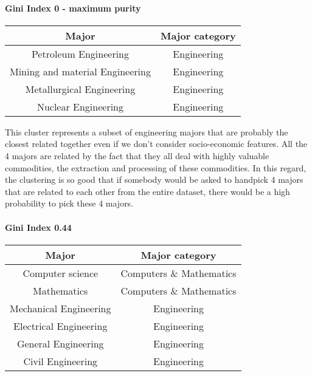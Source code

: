 \documentclass[11pt]{article}
\begin{document}
\paragraph*{Gini Index 0 - maximum purity}

\begin{center}
    \begin{tabular}{||c c||} 
     \hline
     Major & Major category \\ [0.5ex] 
     \hline\hline
     Petroleum Engineering & Engineering \\ 
     \hline
     Mining and material Engineering & Engineering \\
     \hline
     Metallurgical Engineering & Engineering\\
     \hline
     Nuclear Engineering & Engineering\\
     \hline
    \end{tabular}
\end{center}

This cluster represents a subset of engineering majors that are probably the closest related together even if we don't consider socio-economic features. All the 4 majors are related by the fact that they all deal with highly valuable commodities, the extraction and processing of these commodities. In this regard, the clustering is so good that if somebody would be asked to handpick 4 majors that are related to each other from the entire dataset, there would be a high probability to pick these 4 majors.

\paragraph*{Gini Index 0.44}

\begin{center}
    \begin{tabular}{||c c||} 
     \hline
     Major & Major category \\ [0.5ex] 
     \hline\hline
     Computer science & Computers \& Mathematics \\ 
     \hline
     Mathematics & Computers \& Mathematics \\
     \hline
     Mechanical Engineering & Engineering\\
     \hline
     Electrical Engineering & Engineering\\
     \hline
     General Engineering & Engineering\\
     \hline
     Civil Engineering & Engineering\\
     \hline
    \end{tabular}
\end{center}
\end{document}
